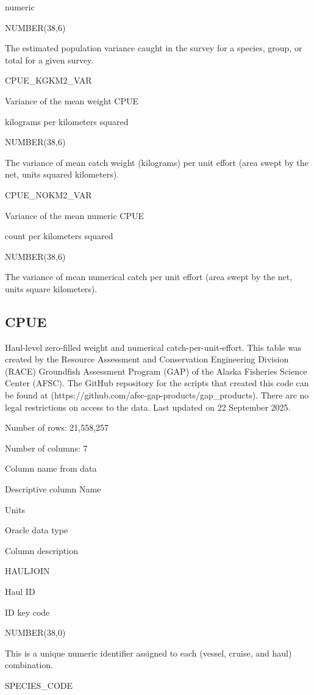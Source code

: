 \documentclass[
  letterpaper,
  oneside,
  open=any]{scrbook}
\begin{document}
numeric

NUMBER(38,6)

The estimated population variance caught in the survey for a species,
group, or total for a given survey.

CPUE\_KGKM2\_VAR

Variance of the mean weight CPUE

kilograms per kilometers squared

NUMBER(38,6)

The variance of mean catch weight (kilograms) per unit effort (area
swept by the net, units squared kilometers).

CPUE\_NOKM2\_VAR

Variance of the mean numeric CPUE

count per kilometers squared

NUMBER(38,6)

The variance of mean numerical catch per unit effort (area swept by the
net, units square kilometers).

\subsection{CPUE}\label{cpue}

Haul-level zero-filled weight and numerical catch-per-unit-effort. This
table was created by the Resource Assessment and Conservation
Engineering Division (RACE) Groundfish Assessment Program (GAP) of the
Alaska Fisheries Science Center (AFSC). The GitHub repository for the
scripts that created this code can be found at
(https://github.com/afsc-gap-products/gap\_products). There are no legal
restrictions on access to the data. Last updated on 22 September 2025.

Number of rows: 21,558,257

Number of columns: 7

Column name from data

Descriptive column Name

Units

Oracle data type

Column description

HAULJOIN

Haul ID

ID key code

NUMBER(38,0)

This is a unique numeric identifier assigned to each (vessel, cruise,
and haul) combination.

SPECIES\_CODE
\end{document}
